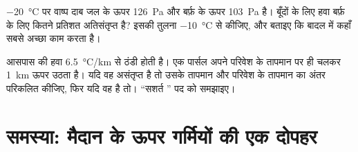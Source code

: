 \begin{exercise}[$\star\star\star$]\label{exo:g10:why-clouds-form:14}
\qty{-20}{\degreeCelsius} पर  वाष्प दाब जल के ऊपर
\qty{126}{Pa} और बर्फ़ के ऊपर \qty{103}{Pa} है। बूँदों के लिए  हवा बर्फ़ के लिए
कितने प्रतिशत अतिसंतृप्त है? इसकी तुलना
\qty{-10}{\degreeCelsius} से कीजिए, और बताइए कि बादल में  कहाँ
सबसे अच्छा काम करता है।
\end{exercise}

\begin{exercise}[$\star\star\star$]\label{exo:g10:why-clouds-form:15}
आसपास की हवा \qty{6.5}{\degreeCelsius/km} से ठंडी होती है। एक पार्सल अपने परिवेश के
तापमान पर ही चलकर \qty{1}{km} ऊपर उठता है। यदि वह असंतृप्त है तो उसके तापमान
और परिवेश के तापमान का अंतर परिकलित कीजिए, फिर यदि वह  है तो। ``सशर्त
'' पद को समझाइए।
\end{exercise}

\section{समस्या: मैदान के ऊपर गर्मियों की एक दोपहर}

